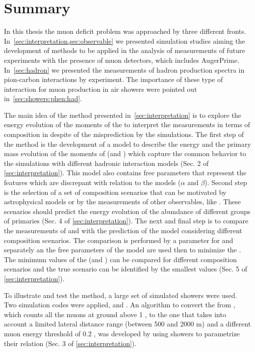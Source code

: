 \chapter[Summary]{Summary}
\label{sec:conclusions}

In this thesis the muon deficit problem was approached by three different fronts.
In~\cref{sec:interpretation,sec:observable} we presented simulation studies aiming
the development of methods to be applied in the analysis of measurements of
future experiments with the presence of muon detectors, which includes AugerPrime.
In~\cref{sec:hadron} we presented the measurements of hadron production spectra
in pion-carbon interactions by \NASixtyOne experiment. The importance of these type
of interaction for muon production in air showers were pointed
out in~\cref{sec:showers:phen:had}. \newline

The main idea of the method presented in~\cref{sec:interpretation}
is to explore the energy evolution of the moments of the \nmu
to interpret the measurements in terms of composition in despite
of the \nmu misprediction by the simulations. The first step of the method
is the development of a model to describe the energy and the primary mass evolution
of the moments of \lgnmu (\lgnmumean and \lgnmurms)
which capture the common behavior to the simulations with different
hadronic interaction models (Sec. 2 of \cref{sec:interpretation}).
This model also contains free parameters that represent
the features which are discrepant with relation to the models ($\alpha$ and $\beta$).
Second step is the selection of a set of composition scenarios that can be
motivated by astrophysical models or by the measurements of other observables, like \xmax.
These scenarios should predict the energy evolution of the abundance of different
groups of primaries (Sec. 4 of \cref{sec:interpretation}).
The next and final step is to compare the measurements of \lgnmumean and \lgnmurms
with the prediction of the model considering different composition scenarios. The comparison
is performed by a \cchi parameter for \lgnmumean and \lgnmurms separately an the free parameters of the model
are used then to minimize the \cchi. The minimum values of the \cchi (\chiminalpha and \chiminbeta)
can be compared for different composition scenarios and the true scenario can be identified by the smallest
values (Sec. 5 of \cref{sec:interpretation}).

To illustrate and test the method, a large set of simulated showers were used.
Two simulation codes were applied, \Conex and \Corsika. An algorithm to convert
the \nmu from \Conex, which counts all the muons at ground above 1 \GeV, to the
one that takes into account a limited lateral distance range (between 500 and 2000 m)
and a different muon energy threshold of 0.2 \GeV,
was developed by using \Corsika showers to parametrize their relation
(Sec. 3 of \cref{sec:interpretation}).

